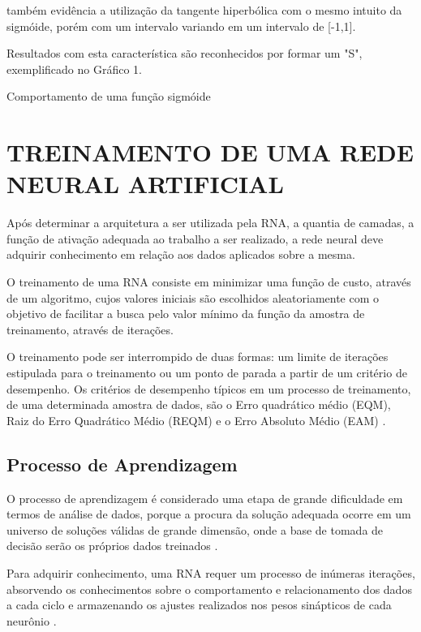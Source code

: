  também evidência a utilização da tangente hiperbólica com o mesmo intuito da sigmóide, porém com um intervalo variando em um intervalo de [-1,1].
\codigoPython\


Resultados com esta característica são reconhecidos por formar um "S", exemplificado no Gráfico 1.

\begin{grafico}[h]
	\centering
	\caption{Comportamento de uma função sigmóide}
	\label{sigmoide-graph}
\end{grafico}


\section{TREINAMENTO DE UMA REDE NEURAL ARTIFICIAL}\label{sec:rna-treinamento}
Após determinar a arquitetura a ser utilizada pela RNA, a quantia de camadas, a função de ativação adequada ao trabalho a ser realizado, a rede neural deve adquirir conhecimento em relação aos dados aplicados sobre a mesma.

O treinamento de uma RNA consiste em minimizar uma função de custo, através de um algoritmo, cujos valores iniciais são escolhidos aleatoriamente com o objetivo de facilitar a busca  pelo valor mínimo da função da amostra de treinamento, através de iterações. 

O treinamento pode ser interrompido de duas formas: um limite de iterações estipulada para o treinamento ou um ponto de parada a partir de um critério de desempenho. Os critérios de desempenho típicos em um processo de treinamento, de uma determinada amostra de dados, são o Erro quadrático médio (EQM), Raiz do Erro Quadrático Médio (REQM) e o Erro Absoluto Médio (EAM) \cite{gambogi}. 

\subsection{Processo de Aprendizagem}
O processo de aprendizagem é considerado uma etapa de grande dificuldade em termos de análise de dados, porque a procura da solução adequada ocorre em um universo de soluções válidas de grande dimensão, onde a base de tomada de decisão serão os próprios dados treinados \cite{medeiros}.
 
Para adquirir conhecimento, uma RNA requer um processo de inúmeras iterações, absorvendo os conhecimentos sobre o comportamento e relacionamento dos dados a cada ciclo e armazenando os ajustes realizados nos pesos sinápticos de cada neurônio \cite{neto}.

